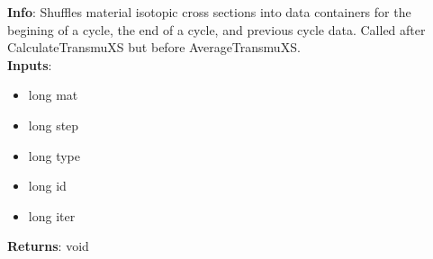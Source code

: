 \textbf{Info}: Shuffles material isotopic cross sections into data containers for
the begining of a cycle, the end of a cycle, and previous cycle data. Called
after CalculateTransmuXS but before AverageTransmuXS.\\

\noindent \textbf{Inputs}:
\begin{itemize}
\item{long mat}
\item{long step}
\item{long type}
\item{long id}
\item{long iter}
\end{itemize}

\noindent \textbf{Returns}: void
